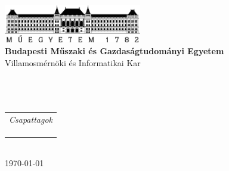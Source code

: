 \begin{titlepage}
\begin{center}
\includegraphics[width=60mm,keepaspectratio]{figures/BMElogo.png}\\
\vspace{0.3cm}
\textbf{Budapesti Műszaki és Gazdaságtudományi Egyetem}\\
\textmd{Villamosmérnöki és Informatikai Kar}\\
\textmd{\viktanszek}\\[4cm]

\vspace{0.4cm}
{\huge \bfseries \vikcim}\\[0.8cm]
\vspace{0.5cm}
\textsc{\Large \vikdoktipus}\\[4cm]


\begin{tabular}{cc}
	\multicolumn{2}{c}{\emph{Csapattagok}}\\
	\makebox[3cm]{\vikcsapattagI}&
	\makebox[3cm]{\vikneptunI}\\
	\makebox[3cm]{\vikcsapattagIII}&
	\makebox[3cm]{\vikneptunIII}\\
	\makebox[3cm]{\vikcsapattagII}&
	\makebox[3cm]{\vikneptunII}\\
\end{tabular}\\[1cm]


\vfill
{\large \today}
\end{center}
\end{titlepage}


